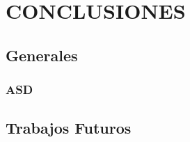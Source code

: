 
\chapter{CONCLUSIONES} %

\label{C6} %



\section{Generales}


\subsection{ASD}


\section{Trabajos Futuros}
